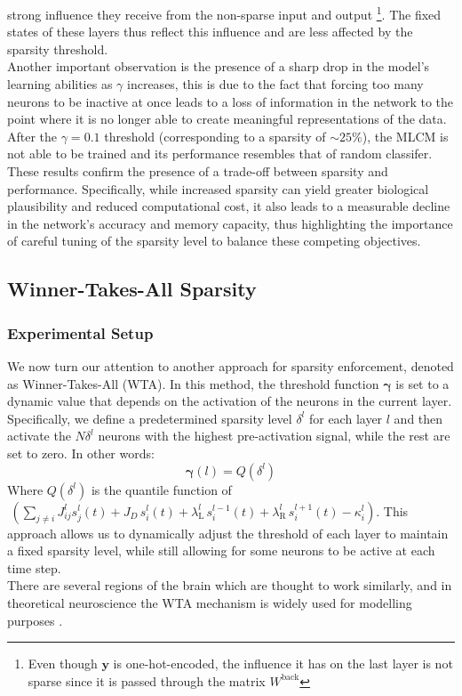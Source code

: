 \documentclass[a4paper,12pt]{report}
\begin{document}
strong influence they receive from the non-sparse input and output
\footnote{Even though $\mathbf{y}$ is one-hot-encoded, 
the influence it has on the last layer is not sparse since it is passed through the 
matrix $W^{\mathrm{back}}$}. The fixed states of these layers thus reflect this 
influence and are less affected by the sparsity threshold. \\
Another important observation is the presence of a sharp drop in the model's learning 
abilities as $\gamma$ increases, this is due to the fact that forcing too many neurons 
to be inactive at once leads to a loss of information in the network to the point 
where it is no longer able to create meaningful representations of the data. After the 
$\gamma = 0.1$ threshold (corresponding to a sparsity of $\sim25\%$), the MLCM is not 
able to be trained and its performance resembles that of random classifer. \\
These results confirm the presence of a trade-off between sparsity and performance. 
Specifically, while increased sparsity can yield greater biological plausibility and 
reduced computational cost, it also leads to a measurable decline in the network's 
accuracy and memory capacity, thus highlighting the importance of careful tuning of the 
sparsity level to balance these competing objectives.
\subsection{Winner-Takes-All Sparsity}
\subsubsection*{Experimental Setup}
We now turn our attention to another approach for sparsity enforcement, denoted as 
Winner-Takes-All (WTA). In this method, the threshold function $\boldsymbol{\gamma}$ 
is set to a dynamic value that depends on the activation of the neurons in the
current layer. Specifically, we define a predetermined sparsity level $\delta^l$ 
for each layer $l$ and then activate the $N\delta^l$ neurons with the highest 
pre-activation signal, while the rest are set to zero. In other words:
$$ \boldsymbol{\gamma}(l) = Q\left(\delta^l\right)$$
Where $Q\left(\delta^l\right)$ is the quantile function of $\hspace{3pt} \left(\displaystyle
\sum_{j \neq i} J_{ij}^l s_j^l(t) + J_D\, s_i^l(t) + \lambda_{\mathrm{L}}^l \, 
s_i^{l-1}(t) + \lambda_{\mathrm{R}}^l\, s_i^{l+1}(t)  - \kappa_i^l\right)$.
This approach allows us to dynamically adjust the threshold of each layer to maintain 
a fixed sparsity level, while still allowing for some neurons to be active at each
time step. \\
There are several regions of the brain which are thought to work similarly, and in 
theoretical neuroscience the WTA mechanism is widely used for modelling purposes
\cite{Marx2015, Carandini2011}. \\
\end{document}
